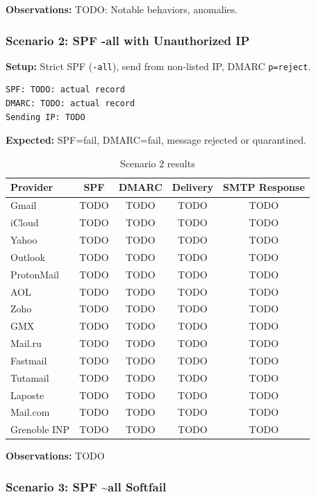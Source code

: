 \documentclass[11pt,a4paper]{article}
\begin{document}
\textbf{Observations:} TODO: Notable behaviors, anomalies.


\subsubsection{Scenario 2: SPF -all with Unauthorized IP}

\textbf{Setup:} Strict SPF (\texttt{-all}), send from non-listed IP, DMARC \texttt{p=reject}.

\begin{lstlisting}
SPF: TODO: actual record
DMARC: TODO: actual record
Sending IP: TODO
\end{lstlisting}

\textbf{Expected:} SPF=fail, DMARC=fail, message rejected or quarantined.

\begin{table}[h]
\centering
\small
\begin{tabular}{lcccc}
\toprule
\textbf{Provider} & \textbf{SPF} & \textbf{DMARC} & \textbf{Delivery} & \textbf{SMTP Response} \\
\midrule
Gmail & TODO & TODO & TODO & TODO \\
iCloud & TODO & TODO & TODO & TODO \\
Yahoo & TODO & TODO & TODO & TODO \\
Outlook & TODO & TODO & TODO & TODO \\
ProtonMail & TODO & TODO & TODO & TODO \\
AOL & TODO & TODO & TODO & TODO \\
Zoho & TODO & TODO & TODO & TODO \\
GMX & TODO & TODO & TODO & TODO \\
Mail.ru & TODO & TODO & TODO & TODO \\
Fastmail & TODO & TODO & TODO & TODO \\
Tutamail & TODO & TODO & TODO & TODO \\
Laposte & TODO & TODO & TODO & TODO \\
Mail.com & TODO & TODO & TODO & TODO \\
Grenoble INP & TODO & TODO & TODO & TODO \\
\bottomrule
\end{tabular}
\caption{Scenario 2 results}
\end{table}

\textbf{Observations:} TODO


\subsubsection{Scenario 3: SPF \textasciitilde all Softfail}
\end{document}
